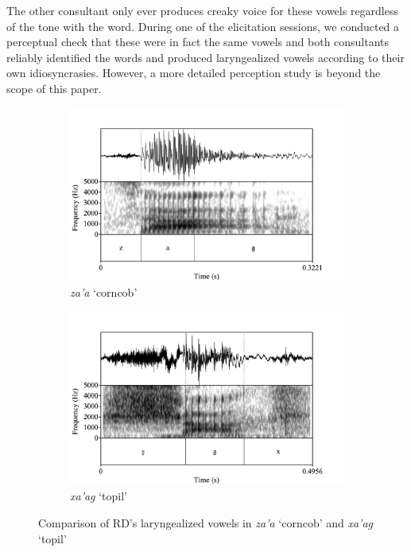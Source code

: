 \documentclass[12pt, letterpaper]{article}
\begin{document}
The other consultant only ever produces creaky voice for these vowels regardless of the tone with the word. During one of the elicitation sessions, we conducted a perceptual check that these were in fact the same vowels and both consultants reliably identified the words and produced laryngealized vowels according to their own idiosyncrasies. However, a more detailed perception study is beyond the scope of this paper. 
\begin{figure}[!h]
	\begin{subfigure}{.5\textwidth}
		\centering
		\includegraphics[width=\linewidth]{RD_za'a.png}
		\caption{\textit{za'a} `corncob'}
		\label{fig:za'a}
	\end{subfigure}%
	\begin{subfigure}{.5\textwidth}
		\centering
		\includegraphics[width=\linewidth]{RD_xa'ag.png}
		\caption{\textit{xa'ag} `topil'}
		\label{fig:xa'ag}
	\end{subfigure}
	\caption{Comparison of RD's laryngealized vowels in \textit{za'a} `corncob' and \textit{xa'ag} `topil'}
	\label{fig:RDLaryngeal}
\end{figure}
\end{document}
